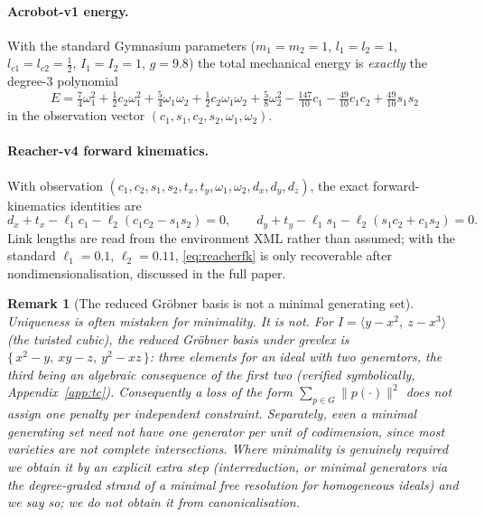 \documentclass{article}
\newtheorem{remark}{Remark}
\begin{document}
\paragraph{Acrobot-v1 energy.} With the standard Gymnasium parameters
($m_1{=}m_2{=}1$, $l_1{=}l_2{=}1$, $l_{c1}{=}l_{c2}{=}\tfrac12$,
$I_1{=}I_2{=}1$, $g{=}9.8$) the total mechanical energy is \emph{exactly} the
degree-$3$ polynomial
\begin{equation}
\label{eq:acrobotE}
E = \tfrac{7}{4}\omega_1^2 + \tfrac{1}{2}c_2\omega_1^2
  + \tfrac{5}{4}\omega_1\omega_2 + \tfrac{1}{2}c_2\omega_1\omega_2
  + \tfrac{5}{8}\omega_2^2
  - \tfrac{147}{10}c_1 - \tfrac{49}{10}c_1c_2 + \tfrac{49}{10}s_1s_2
\end{equation}
in the observation vector $(c_1, s_1, c_2, s_2, \omega_1, \omega_2)$.

\paragraph{Reacher-v4 forward kinematics.} With observation
$(c_1, c_2, s_1, s_2, t_x, t_y, \omega_1, \omega_2, d_x, d_y, d_z)$, the
exact forward-kinematics identities are
\begin{equation}
\label{eq:reacherfk}
d_x + t_x - \ell_1 c_1 - \ell_2 (c_1c_2 - s_1s_2) = 0,
\qquad
d_y + t_y - \ell_1 s_1 - \ell_2 (s_1c_2 + c_1s_2) = 0.
\end{equation}
Link lengths are read from the environment XML rather than assumed; with the
standard $\ell_1 = 0.1$, $\ell_2 = 0.11$, \eqref{eq:reacherfk} is only
recoverable after nondimensionalisation, discussed in the full paper.


\begin{remark}[The reduced Gr\"obner basis is not a minimal generating set]
\label{rem:notminimal}
Uniqueness is often mistaken for minimality. It is not. For
$I = \langle y - x^2,\ z - x^3 \rangle$ (the twisted cubic), the reduced
Gr\"obner basis under grevlex is $\{\,x^2 - y,\ xy - z,\ y^2 - xz\,\}$: three
elements for an ideal with two generators, the third being an algebraic
consequence of the first two (verified symbolically,
Appendix~\ref{app:tc}). Consequently a loss of the form
$\sum_{p \in G} \|p(\cdot)\|^2$ does \emph{not} assign one penalty per
independent constraint. Separately, even a minimal generating set need not
have one generator per unit of codimension, since most varieties are not
complete intersections. Where minimality is genuinely required we obtain it
by an explicit extra step (interreduction, or minimal generators via the
degree-graded strand of a minimal free resolution for homogeneous ideals) and
we say so; we do not obtain it from canonicalisation.
\end{remark}
\end{document}
